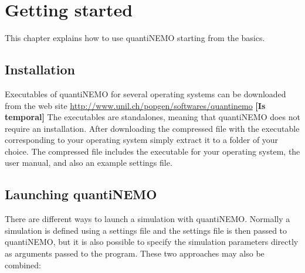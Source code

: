 \documentclass[letterpaper,12pt,oneside]{book}
\newcommand{\tbc}[1]{\small {\bf \color{red} [Is temporal]} \normalsize} %
\begin{document}
\newpage
\chapter{Getting started}
\label{chap:gettingStarted}
This chapter explains how to use quantiNEMO starting from the basics. 


\section{Installation}
Executables of quantiNEMO for several operating systems can be downloaded from the web site \url{http://www.unil.ch/popgen/softwares/quantinemo} \tbc. The executables are standalones, meaning that quantiNEMO does not require an installation. After downloading the compressed file with the executable corresponding to your operating system simply extract it to a folder of your choice. The compressed file includes the executable for your operating system, the user manual, and also an example settings file.


\section{Launching quantiNEMO}\label{launchQuantiNemo}
There are different ways to launch a simulation with quantiNEMO. Normally a simulation is defined using a settings file and the settings file is then passed to quantiNEMO, but it is also possible to specify the simulation parameters directly as arguments passed to the program. These two approaches may also be combined:
\end{document}
